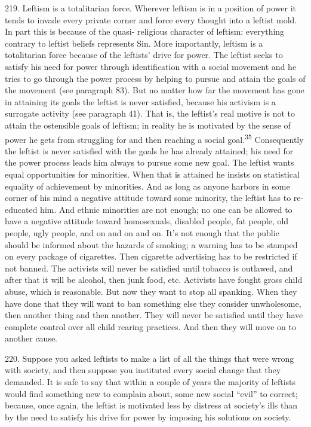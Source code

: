 \documentclass{article}
\begin{document}
219. Leftism is a totalitarian force. Wherever leftism is in a position of power it tends to invade 
every private corner and force every thought into a leftist mold. In part this is because of the quasi-
religious character of leftism: everything contrary to leftist beliefs represents Sin. More 
importantly, leftism is a totalitarian force because of the leftists’ drive for power. The leftist seeks 
to satisfy his need for power through identification with a social movement and he tries to go 
through the power process by helping to pursue and attain the goals of the movement (see 
paragraph 83). But no matter how far the movement has gone in attaining its goals the leftist is 
never satisfied, because his activism is a surrogate activity (see paragraph 41). That is, the leftist’s 
real motive is not to attain the ostensible goals of leftism; in reality he is motivated by the sense of 
power he gets from struggling for and then reaching a social goal.\textsuperscript{35} Consequently the leftist is 
never satisfied with the goals he has already attained; his need for the power process leads him 
always to pursue some new goal. The leftist wants equal opportunities for minorities. When that 
is attained he insists on statistical equality of achievement by minorities. And as long as anyone 
harbors in some corner of his mind a negative attitude toward some minority, the leftist has to re-
educated him. And ethnic minorities are not enough; no one can be allowed to have a negative 
attitude toward homosexuals, disabled people, fat people, old people, ugly people, and on and on 
and on. It’s not enough that the public should be informed about the hazards of smoking; a warning 
has to be stamped on every package of cigarettes. Then cigarette advertising has to be restricted 
if not banned. The activists will never be satisfied until tobacco is outlawed, and after that it will 
be alcohol, then junk food, etc. Activists have fought gross child abuse, which is reasonable. But 
now they want to stop all spanking. When they have done that they will want to ban something 
else they consider unwholesome, then another thing and then another. They will never be satisfied 
until they have complete control over all child rearing practices. And then they will move on to 
another cause. \vspace{\baselineskip}

220. Suppose you asked leftists to make a list of all the things that were wrong with society, and 
then suppose you instituted every social change that they demanded. It is safe to say that within a 
couple of years the majority of leftists would find something new to complain about, some new 
social “evil” to correct; because, once again, the leftist is motivated less by distress at society’s ills 
than by the need to satisfy his drive for power by imposing his solutions on society. \vspace{\baselineskip}
\end{document}

